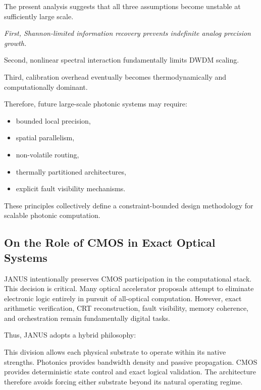 \documentclass[journal]{IEEEtran}
\begin{document}
The present analysis suggests that all three assumptions become unstable at sufficiently large scale.

{\itshape First, Shannon-limited information recovery prevents indefinite analog precision growth.

Second, nonlinear spectral interaction fundamentally limits DWDM scaling.

Third, calibration overhead eventually becomes thermodynamically and computationally dominant.}

Therefore, future large-scale photonic systems may require:
\begin{itemize}
\item bounded local precision,
\item spatial parallelism,
\item non-volatile routing,
\item thermally partitioned architectures,
\item explicit fault visibility mechanisms.
\end{itemize}

These principles collectively define a constraint-bounded design methodology for scalable photonic computation.

\subsection{\textbf{On the Role of CMOS in Exact Optical Systems}}

JANUS intentionally preserves CMOS participation in the computational stack. This decision is critical. Many optical accelerator proposals attempt to eliminate electronic logic entirely in pursuit of all-optical computation. However, exact arithmetic verification, CRT reconstruction, fault visibility, memory coherence, and orchestration remain fundamentally digital tasks.

Thus, JANUS adopts a hybrid philosophy:

\begin{center}
\end{center}

\begin{center}
\end{center}

This division allows each physical substrate to operate within its native strengths. Photonics provides bandwidth density and passive propagation. CMOS provides deterministic state control and exact logical validation. The architecture therefore avoids forcing either substrate beyond its natural operating regime.
\end{document}
